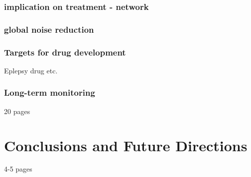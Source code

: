 \subsection{implication on treatment - network}
\subsection{global noise reduction}
\subsection{Targets for drug development}
Eplepsy drug etc.
\subsection{Long-term monitoring}

20 pages

\chapter{Conclusions and Future Directions}
4-5 pages
